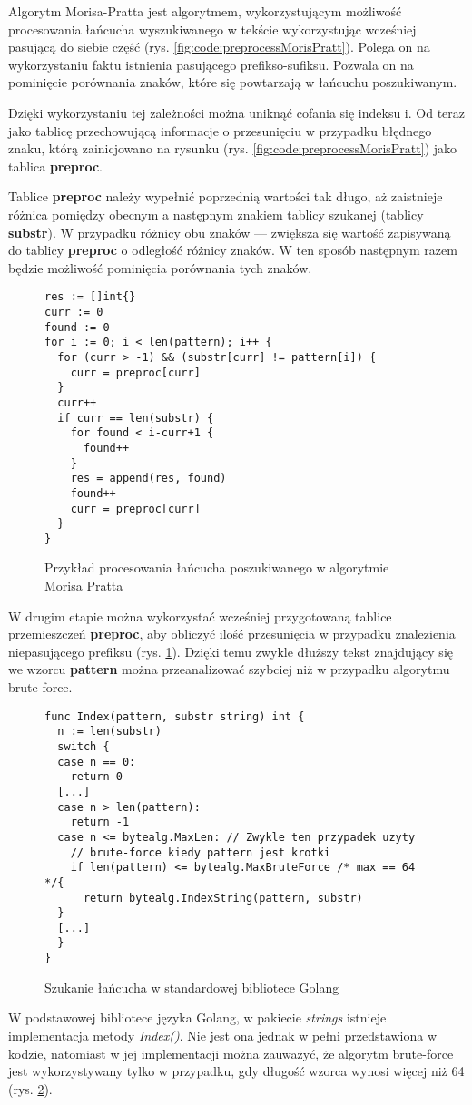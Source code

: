 Algorytm Morisa-Pratta jest algorytmem, wykorzystującym możliwość procesowania 
łańcucha wyszukiwanego w tekście wykorzystując wcześniej pasującą do siebie część
(rys. \ref{fig:code:preprocessMorisPratt}). Polega on na wykorzystaniu faktu
 istnienia pasującego prefikso-sufiksu. Pozwala on na pominięcie porównania
 znaków, które się powtarzają w łańcuchu poszukiwanym.

Dzięki wykorzystaniu tej zależności można uniknąć cofania się indeksu i. 
Od teraz jako tablicę przechowującą informacje o przesunięciu w przypadku 
błędnego znaku, którą zainicjowano na rysunku (rys. \ref{fig:code:preprocessMorisPratt})
jako tablica \textbf{preproc}.

Tablice \textbf{preproc} należy wypełnić poprzednią wartości tak długo, aż zaistnieje
różnica pomiędzy obecnym a następnym znakiem tablicy szukanej (tablicy 
\textbf{substr}). W przypadku różnicy obu znaków — zwiększa się wartość zapisywaną 
do tablicy \textbf{preproc} o odległość różnicy znaków. W ten sposób następnym
 razem będzie możliwość pominięcia porównania tych znaków.

\begin{figure}[h]
  \centering
  \begin{lstlisting}
res := []int{}
curr := 0
found := 0
for i := 0; i < len(pattern); i++ {
  for (curr > -1) && (substr[curr] != pattern[i]) {
    curr = preproc[curr]
  }
  curr++
  if curr == len(substr) {
    for found < i-curr+1 {
      found++
    }
    res = append(res, found)
    found++
    curr = preproc[curr]
  }
}
  \end{lstlisting}
  \caption{Przykład procesowania łańcucha poszukiwanego w algorytmie Morisa Pratta}
  \label{fig:code:algoMorisPratt}
\end{figure}

W drugim etapie można wykorzystać wcześniej przygotowaną tablice przemieszczeń 
\textbf{preproc}, aby obliczyć ilość przesunięcia w przypadku znalezienia 
niepasującego prefiksu (rys. \ref{fig:code:algoMorisPratt}). Dzięki temu zwykle 
dłuższy tekst znajdujący się we wzorcu \textbf{pattern} można przeanalizować szybciej
niż w przypadku algorytmu brute-force.

\begin{figure}[h]
    \centering
\begin{lstlisting}
func Index(pattern, substr string) int {
  n := len(substr)
  switch {
  case n == 0:
    return 0
  [...]
  case n > len(pattern):
    return -1
  case n <= bytealg.MaxLen: // Zwykle ten przypadek uzyty
    // brute-force kiedy pattern jest krotki
    if len(pattern) <= bytealg.MaxBruteForce /* max == 64 */{
      return bytealg.IndexString(pattern, substr)
  }
  [...]
  }
}
\end{lstlisting}
\caption{Szukanie łańcucha w standardowej bibliotece Golang}
\label{fig:code:golangSearchInsideString}
\end{figure}
W podstawowej bibliotece języka Golang, w pakiecie \textit{strings} istnieje 
implementacja metody \textit{Index()}. Nie jest ona jednak w pełni przedstawiona
w kodzie, natomiast w jej implementacji można zauważyć, że algorytm brute-force
jest wykorzystywany tylko w przypadku, gdy długość wzorca wynosi więcej niż 64 
(rys. \ref{fig:code:golangSearchInsideString}).

